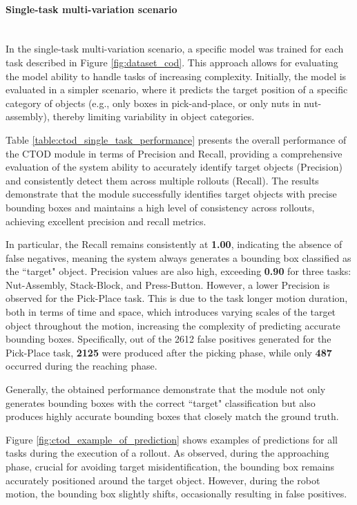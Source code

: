 \paragraph*{Single-task multi-variation scenario}\mbox{}\\
In the single-task multi-variation scenario, a specific model was trained for each task described in Figure \ref{fig:dataset_cod}. This approach allows for evaluating the model ability to handle tasks of increasing complexity. Initially, the model is evaluated in a simpler scenario, where it predicts the target position of a specific category of objects (e.g., only boxes in pick-and-place, or only nuts in nut-assembly), thereby limiting variability in object categories.

Table \ref{table:ctod_single_task_performance} presents the overall performance of the CTOD module in terms of Precision and Recall, providing a comprehensive evaluation of the system ability to accurately identify target objects (Precision) and consistently detect them across multiple rollouts (Recall). The results demonstrate that the module successfully identifies target objects with precise bounding boxes and maintains a high level of consistency across rollouts, achieving excellent precision and recall metrics. 

In particular, the Recall remains consistently at \textbf{1.00}, indicating the absence of false negatives, meaning the system always generates a bounding box classified as the ``target" object. Precision values are also high, exceeding \textbf{0.90} for three tasks: Nut-Assembly, Stack-Block, and Press-Button. However, a lower Precision is observed for the Pick-Place task. This is due to the task longer motion duration, both in terms of time and space, which introduces varying scales of the target object throughout the motion, increasing the complexity of predicting accurate bounding boxes. Specifically, out of the 2612 false positives generated for the Pick-Place task, \textbf{2125} were produced after the picking phase, while only \textbf{487} occurred during the reaching phase.

Generally, the obtained performance demonstrate that the module not only generates bounding boxes with the correct ``target" classification but also produces highly accurate bounding boxes that closely match the ground truth. 

Figure \ref{fig:ctod_example_of_prediction} shows examples of predictions for all tasks during the execution of a rollout. As observed, during the approaching phase, crucial for avoiding target misidentification, the bounding box remains accurately positioned around the target object. However, during the robot motion, the bounding box slightly shifts, occasionally resulting in false positives.


